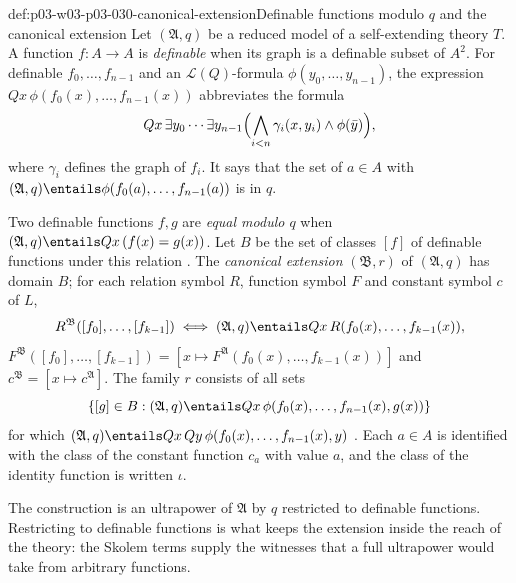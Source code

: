 \begin{hbdefinition}{def:p03-w03-p03-030-canonical-extension}{Definable functions modulo \(q\) and the canonical extension}
Let \((\mathfrak A,q)\) be a reduced model of a self-extending theory \(T\).
A function \(f:A\to A\) is \emph{definable} when its graph is a definable
subset of \(A^2\).  For definable \(f_0,\ldots,f_{n-1}\) and an
\(\mathscr L(Q)\)-formula \(\phi(y_0,\ldots,y_{n-1})\), the expression
\(Qx\,\phi(f_0(x),\ldots,f_{n-1}(x))\) abbreviates the formula
\[
 Qx\,\exists y_0\cdots\exists y_{n-1}\Bigl(\bigwedge_{i<n}\gamma_i(x,y_i)\wedge
 \phi(\bar y)\Bigr),
\]
where \(\gamma_i\) defines the graph of \(f_i\).  It says that the set of
\(a\in A\) with \((\mathfrak A,q)\entails\phi(f_0(a),\ldots,f_{n-1}(a))\) is
in \(q\).

Two definable functions \(f,g\) are \emph{equal modulo \(q\)} when
\((\mathfrak A,q)\entails Qx\,(f(x)=g(x))\).  Let \(B\) be the set of classes
\([f]\) of definable functions under this relation
\cite[p.~203]{Schmerl1985TransferTheorems}.  The \emph{canonical extension}
\((\mathfrak B,r)\) of \((\mathfrak A,q)\) has domain \(B\); for each
relation symbol \(R\), function symbol \(F\) and constant symbol \(c\) of
\(L\),
\[
 R^{\mathfrak B}([f_0],\ldots,[f_{k-1}])
   \iff (\mathfrak A,q)\entails Qx\,R(f_0(x),\ldots,f_{k-1}(x)),
\]
\(F^{\mathfrak B}([f_0],\ldots,[f_{k-1}])=[x\mapsto
F^{\mathfrak A}(f_0(x),\ldots,f_{k-1}(x))]\) and \(c^{\mathfrak B}=[x\mapsto
c^{\mathfrak A}]\).  The family \(r\) consists of all sets
\[
 \{[g]\in B:(\mathfrak A,q)\entails Qx\,\phi(f_0(x),\ldots,f_{n-1}(x),g(x))\}
\]
for which \((\mathfrak A,q)\entails Qx\,Qy\,\phi(f_0(x),\ldots,f_{n-1}(x),y)\)
\cite[p.~203]{Schmerl1985TransferTheorems}.  Each \(a\in A\) is identified
with the class of the constant function \(c_a\) with value \(a\), and the
class of the identity function is written \(\iota\).
\end{hbdefinition}

The construction is an ultrapower of \(\mathfrak A\) by \(q\) restricted to
definable functions.  Restricting to definable functions is what keeps the
extension inside the reach of the theory: the Skolem terms supply the
witnesses that a full ultrapower would take from arbitrary functions.

